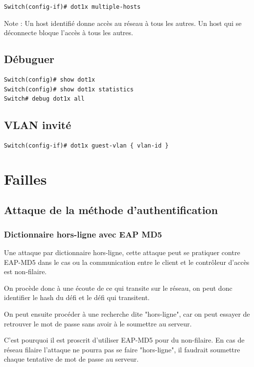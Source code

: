 \begin{verbatim}
Switch(config-if)# dot1x multiple-hosts
\end{verbatim}

Note : Un host identifié donne accès au réseau à tous les autres. Un host qui se déconnecte bloque l'accès à tous les autres.

\subsection{Débuguer}

\begin{verbatim}
Switch(config)# show dot1x
Switch(config)# show dot1x statistics
Switch# debug dot1x all
\end{verbatim}

\subsection{VLAN invité}

\begin{verbatim}
Switch(config-if)# dot1x guest-vlan { vlan-id }
\end{verbatim}

\section{Failles}

\subsection{Attaque de la méthode d'authentification}

\subsubsection{Dictionnaire hors-ligne avec EAP MD5}

Une attaque par dictionnaire hors-ligne, cette attaque peut se pratiquer contre EAP-MD5 dans le cas ou la communication entre le client et le contrôleur d'accès est non-filaire. 

On procède donc à une écoute de ce qui transite sur le réseau, on peut donc identifier le hash du défi et le défi qui transitent. 

On peut ensuite procéder à une recherche dite "hors-ligne", car on peut essayer de retrouver le mot de passe sans avoir à le soumettre au serveur. 

C'est pourquoi il est proscrit d'utiliser EAP-MD5 pour du non-filaire. En cas de réseau filaire l'attaque ne pourra pas se faire "hors-ligne", il faudrait soumettre chaque tentative de mot de passe au serveur. 

